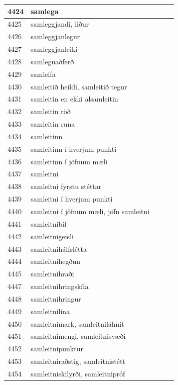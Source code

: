 \begin{longtable}{p{}|p{}|p{}|p{}|p{}}
\hline
4424 & samlega &  &  &  \\
\hline
4425 & samleggjandi, liður &  &  &  \\
\hline
4426 & samleggjanlegur &  &  &  \\
\hline
4427 & samleggjanleiki &  &  &  \\
\hline
4428 & samleguaðferð &  &  &  \\
\hline
4429 & samleifa &  &  &  \\
\hline
4430 & samleitið heildi, samleitið tegur &  &  &  \\
\hline
4431 & samleitin en ekki alsamleitin &  &  &  \\
\hline
4432 & samleitin röð &  &  &  \\
\hline
4433 & samleitin runa &  &  &  \\
\hline
4434 & samleitinn &  &  &  \\
\hline
4435 & samleitinn í hverjum punkti &  &  &  \\
\hline
4436 & samleitinn í jöfnum mæli &  &  &  \\
\hline
4437 & samleitni &  &  &  \\
\hline
4438 & samleitni fyrstu stéttar &  &  &  \\
\hline
4439 & samleitni í hverjum punkti &  &  &  \\
\hline
4440 & samleitni í jöfnum mæli, jöfn samleitni &  &  &  \\
\hline
4441 & samleitnibil &  &  &  \\
\hline
4442 & samleitnigeisli &  &  &  \\
\hline
4443 & samleitnihálfslétta &  &  &  \\
\hline
4444 & samleitnihegðun &  &  &  \\
\hline
4445 & samleitnihraði &  &  &  \\
\hline
4447 & samleitnihringskífa &  &  &  \\
\hline
4448 & samleitnihringur &  &  &  \\
\hline
4449 & samleitnilína &  &  &  \\
\hline
4450 & samleitnimark, samleitniláhnit &  &  &  \\
\hline
4451 & samleitnimengi, samleitnisvæði &  &  &  \\
\hline
4452 & samleitnipunktur &  &  &  \\
\hline
4453 & samleitniraðstig, samleitnistétt &  &  &  \\
\hline
4454 & samleitniskilyrði, samleitnipróf &  &  &  \\
\hline

\end{longtable}
